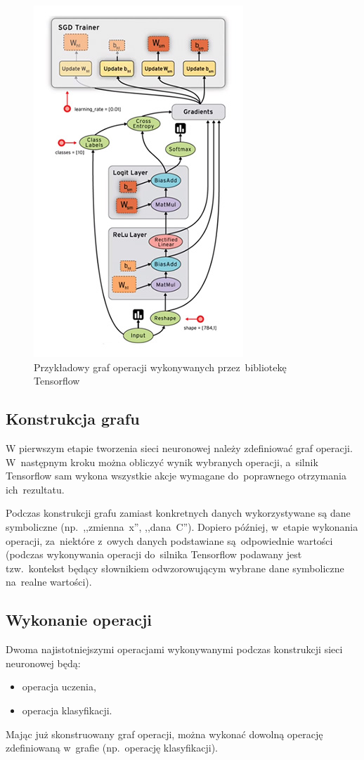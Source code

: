 \begin{figure}[H]
	\centering
	\includegraphics[width=0.5\linewidth]{img/tf-sample-graph.jpg}
	\caption{Przykładowy graf operacji wykonywanych przez~bibliotekę Tensorflow}
	\label{img:tf-smpl-grf}
\end{figure}

\subsection{Konstrukcja grafu}
W pierwszym etapie tworzenia sieci neuronowej należy zdefiniować graf operacji. W~następnym kroku można obliczyć
wynik wybranych operacji, a~silnik Tensorflow sam wykona wszystkie akcje wymagane do~poprawnego otrzymania
ich~rezultatu.

Podczas konstrukcji grafu zamiast konkretnych danych wykorzystywane są dane symboliczne (np.~,,zmienna~x'',
,,dana~C''). Dopiero później, w~etapie wykonania operacji, za~niektóre z~owych danych podstawiane
są~odpowiednie wartości (podczas wykonywania operacji do~silnika Tensorflow podawany jest tzw.~kontekst będący
słownikiem odwzorowującym wybrane dane symboliczne na~realne wartości).


\subsection{Wykonanie operacji}
Dwoma najistotniejszymi operacjami wykonywanymi podczas konstrukcji sieci neuronowej będą:
\begin{itemize}
    \item operacja uczenia,
    \item operacja klasyfikacji.
\end{itemize}

Mając już skonstruowany graf operacji, można wykonać dowolną operację zdefiniowaną w~grafie (np.~operację klasyfikacji).

